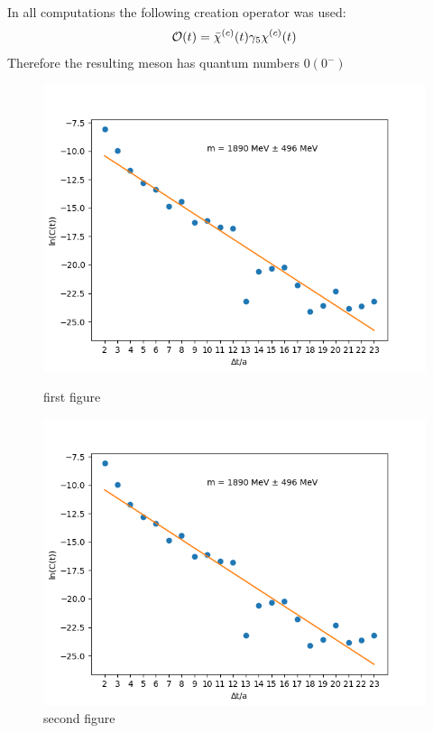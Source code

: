     In all computations the following creation operator was used:
    \begin{equation}
        \mathcal{O}(t) = \bar{\chi}^{(c)}(t)\gamma_5\chi^{(c)}(t)
    \end{equation}
    Therefore the resulting meson has quantum numbers $0(0^-)$

    \begin{figure}[H]
    \centering
    \begin{minipage}{0.5\textwidth}
        \centering
        \includegraphics[width=1\textwidth]{images/Log_1ev.png} %
        \caption{first figure}
    \end{minipage}\hfill
    \begin{minipage}{0.5\textwidth}
        \centering
        \includegraphics[width=1\textwidth]{images/Log_1ev.png} %
        \caption{second figure}
    \end{minipage}
\end{figure}
